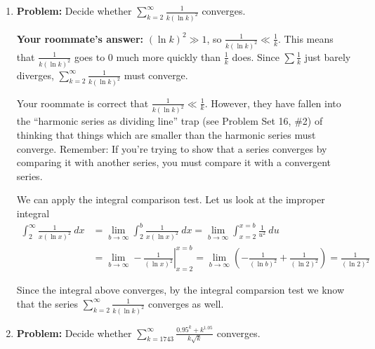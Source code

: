 \documentclass[main]{subfiles}
\begin{document}
\begin{enumerate}
\begin{enumerate}
\begin{solution}
     $$0 \leq \frac{1}{k 4^k} \leq \frac{1}{4^k}$$

     We know that $\sum_{k=10}^\infty \frac{1}{4^k}$ is a geometric series with $|r| = 1/4 <1$, so it converges. Therefore, by the direct comparison test the original series converges as well.
   \end{solution}

 \item
   \begin{problem}
     \textbf{Problem:} Decide whether $\displaystyle \sum_{k=2}^\infty
     \frac{1}{k (\ln k)^2}$ converges.

     \textbf{Your roommate's answer:} $(\ln k)^2 \gg 1$, so $\displaystyle
     \frac{1}{k (\ln k)^2} \ll \frac{1}{k}$.  This means that
     $\displaystyle \frac{1}{k (\ln k)^2}$ goes to 0 much more quickly
     than $\displaystyle \frac{1}{k}$ does.  Since $\displaystyle \sum
     \frac{1}{k}$ just barely diverges, $\displaystyle \sum_{k=2}^\infty
     \frac{1}{k (\ln k)^2}$ must converge.
   \end{problem}

   \begin{solution}
     Your roommate is correct that $\displaystyle \frac{1}{k (\ln k)^2} \ll
     \frac{1}{k}$.  However, they have fallen into the ``harmonic series as
     dividing line'' trap (see Problem Set 16, {\#2}) of thinking
     that things which are smaller than the harmonic series must
     converge.  Remember: If you're trying to show that a series
     converges by comparing it with another series, you must compare it
     with a convergent series.

     We can apply the integral comparison test. Let us look at the improper integral
     \begin{align*}
     \int_2^\infty \frac{1}{x (\ln x)^2}~dx & = \lim_{b \to \infty} \int_2^b \frac{1}{x (\ln x)^2}~dx =  \lim_{b \to \infty} \int_{x=2}^{x=b} \frac{1}{u^2}~du\\
     & = \lim_{b \to \infty} -\left.\frac{1}{(\ln x)^2} \right|_{x=2}^{x=b} = \lim_{b \to \infty} \left(-\frac{1}{(\ln b)^2}+\frac{1}{(\ln 2)^2}\right) = \frac{1}{(\ln 2)^2}
     \end{align*}

     Since the integral above converges, by the integral comparsion test we know that the series $\sum_{k=2}^\infty
     \frac{1}{k (\ln k)^2}$ converges as well.
    \end{solution}


 \item
   \begin{problem}
     \textbf{Problem:} Decide whether $\displaystyle \sum_{k=1743}^\infty
     \frac{0.95^k + k^{1.05}}{k \sqrt{k}}$ converges.


\end{problem}
\end{enumerate}
\end{enumerate}
\end{document}

